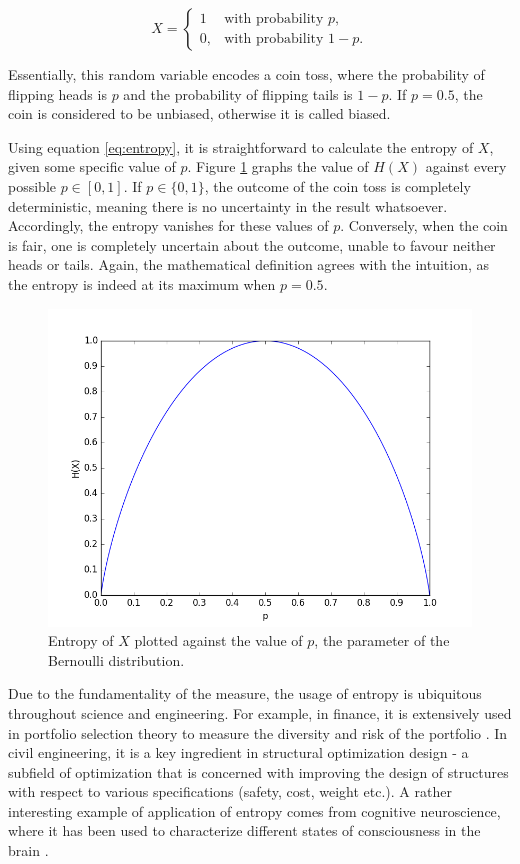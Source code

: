 \documentclass[12pt]{article}
\begin{document}
$$X = \begin{cases} 1 & \mbox{with probability } p, \\ 0, & \mbox{with probability } 1-p. \end{cases}$$

Essentially, this random variable encodes a coin toss, where the probability of flipping heads is $p$ and the probability of flipping tails is $1-p$. If $p=0.5$, the coin is considered to be unbiased, otherwise it is called biased.

Using equation \ref{eq:entropy}, it is straightforward to calculate the entropy of $X$, given some specific value of $p$. Figure \ref{fig:entropy} graphs the value of $H(X)$ against every possible $p \in \left[ 0, 1 \right]$. If $p \in \{0, 1\}$, the outcome of the coin toss is completely deterministic, meaning there is no uncertainty in the result whatsoever. Accordingly, the entropy vanishes for these values of $p$. Conversely, when the coin is fair, one is completely uncertain about the outcome, unable to favour neither heads or tails. Again, the mathematical definition agrees with the intuition, as the entropy is indeed at its maximum when $p = 0.5$.

\begin{figure} [h]
\begin{center}
\includegraphics[width=.9\textwidth]{entropy}
\caption{Entropy of $X$ plotted against the value of $p$, the parameter of the Bernoulli distribution.}
\label{fig:entropy}
\end{center}
\end{figure}

Due to the fundamentality of the measure, the usage of entropy is ubiquitous throughout science and engineering. For example, in finance, it is extensively used in portfolio selection theory to measure the diversity and risk of the portfolio \cite{entropy-finance}. In civil engineering, it is a key ingredient in structural optimization design \cite{Das1994} - a subfield of optimization that is concerned with improving the design of structures with respect to various specifications (safety, cost, weight etc.). A rather interesting example of application of entropy comes from cognitive neuroscience, where it has been used to characterize different states of consciousness in the brain \cite{entropy-consciousness}.
\end{document}
